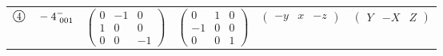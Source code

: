 \documentclass[fleqn,10pt,landscape]{jsarticle}
\begin{document}
\begin{center}
\begin{longtable}{lcccc}
$ {\ooalign{\hfil\resizebox{.8\width}{\height}{4}\hfil\crcr\raise.1ex\hbox{\large$\bigcirc$}}}\quad -4^{-}_{\,\,001} $ & $ \begin{pmatrix} 0 & -1 & 0 \\ 1 & 0 & 0 \\ 0 & 0 & -1 \end{pmatrix} $ & $ \begin{pmatrix} 0 & 1 & 0 \\ -1 & 0 & 0 \\ 0 & 0 & 1 \end{pmatrix} $ & $ \begin{pmatrix} - y & x & - z \end{pmatrix} $ & $ \begin{pmatrix} Y & - X & Z \end{pmatrix} $ \\
\end{longtable}
\end{center}
\newpage
\end{document}
